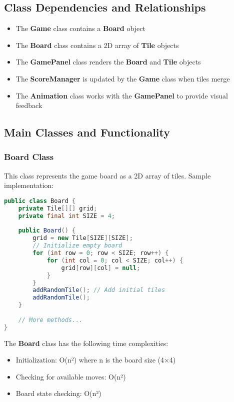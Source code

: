 \documentclass[12pt, a4paper]{article}
\begin{document}
\subsection{Class Dependencies and Relationships}
\begin{itemize}
    \item The \textbf{Game} class contains a \textbf{Board} object
    \item The \textbf{Board} class contains a 2D array of \textbf{Tile} objects
    \item The \textbf{GamePanel} class renders the \textbf{Board} and \textbf{Tile} objects
    \item The \textbf{ScoreManager} is updated by the \textbf{Game} class when tiles merge
    \item The \textbf{Animation} class works with the \textbf{GamePanel} to provide visual feedback
\end{itemize}

\subsection{Main Classes and Functionality}

\subsubsection{Board Class}
This class represents the game board as a 2D array of tiles. Sample implementation:

\begin{lstlisting}[language=Java, caption=Board Class Implementation]
public class Board {
    private Tile[][] grid;
    private final int SIZE = 4;
    
    public Board() {
        grid = new Tile[SIZE][SIZE];
        // Initialize empty board
        for (int row = 0; row < SIZE; row++) {
            for (int col = 0; col < SIZE; col++) {
                grid[row][col] = null;
            }
        }
        addRandomTile(); // Add initial tiles
        addRandomTile();
    }
    
    // More methods...
}
\end{lstlisting}

The \textbf{Board} class has the following time complexities:
\begin{itemize}
    \item Initialization: O(n²) where n is the board size (4×4)
    \item Checking for available moves: O(n²)
    \item Board state checking: O(n²)
\end{itemize}
\end{document}
